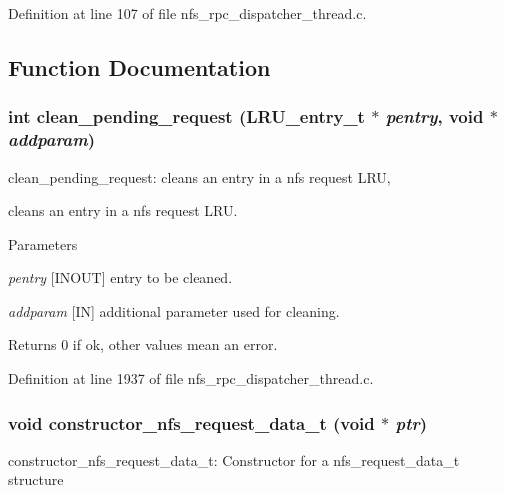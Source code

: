 Definition at line 107 of file nfs\_\-rpc\_\-dispatcher\_\-thread.c.

\subsection{Function Documentation}
\subsubsection[{clean\_\-pending\_\-request}]{\setlength{\rightskip}{0pt plus 5cm}int clean\_\-pending\_\-request (LRU\_\-entry\_\-t $\ast$ {\em pentry}, \/  void $\ast$ {\em addparam})}\label{nfs__rpc__dispatcher__thread_8c_af8096617fe01cfa40ad63e5c15a43983}
clean\_\-pending\_\-request: cleans an entry in a nfs request LRU,

cleans an entry in a nfs request LRU.


\begin{DoxyParams}{Parameters}
\item[{\em pentry}][INOUT] entry to be cleaned. \item[{\em addparam}][IN] additional parameter used for cleaning.\end{DoxyParams}
\begin{DoxyReturn}{Returns}
0 if ok, other values mean an error. 
\end{DoxyReturn}


Definition at line 1937 of file nfs\_\-rpc\_\-dispatcher\_\-thread.c.
\subsubsection[{constructor\_\-nfs\_\-request\_\-data\_\-t}]{\setlength{\rightskip}{0pt plus 5cm}void constructor\_\-nfs\_\-request\_\-data\_\-t (void $\ast$ {\em ptr})}\label{nfs__rpc__dispatcher__thread_8c_afffa743dbd2aef77cdc7d24ec263005f}
constructor\_\-nfs\_\-request\_\-data\_\-t: Constructor for a nfs\_\-request\_\-data\_\-t structure

